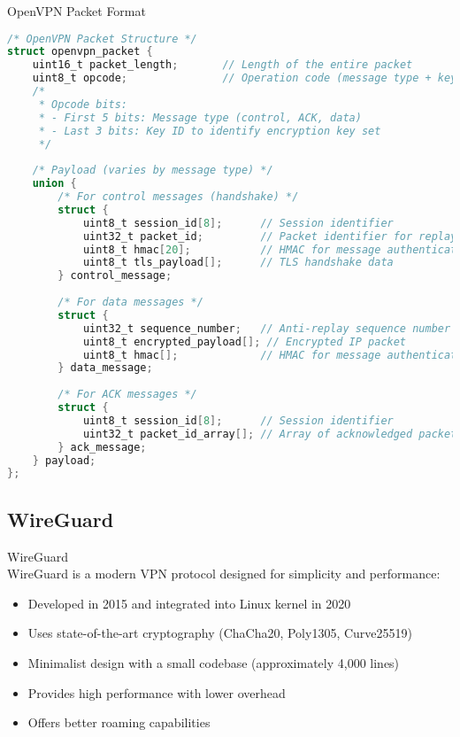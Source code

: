 \begin{code}{OpenVPN Packet Format}\\
\begin{lstlisting}[language=C, style=basesmol]
/* OpenVPN Packet Structure */
struct openvpn_packet {
    uint16_t packet_length;       // Length of the entire packet
    uint8_t opcode;               // Operation code (message type + key ID)
    /* 
     * Opcode bits:
     * - First 5 bits: Message type (control, ACK, data)
     * - Last 3 bits: Key ID to identify encryption key set
     */
    
    /* Payload (varies by message type) */
    union {
        /* For control messages (handshake) */
        struct {
            uint8_t session_id[8];      // Session identifier
            uint32_t packet_id;         // Packet identifier for replay protection
            uint8_t hmac[20];           // HMAC for message authentication
            uint8_t tls_payload[];      // TLS handshake data
        } control_message;
        
        /* For data messages */
        struct {
            uint32_t sequence_number;   // Anti-replay sequence number
            uint8_t encrypted_payload[]; // Encrypted IP packet
            uint8_t hmac[];             // HMAC for message authentication
        } data_message;
        
        /* For ACK messages */
        struct {
            uint8_t session_id[8];      // Session identifier
            uint32_t packet_id_array[]; // Array of acknowledged packet IDs
        } ack_message;
    } payload;
};
\end{lstlisting}
\end{code}

\subsection{WireGuard}

\begin{definition}{WireGuard}\\
WireGuard is a modern VPN protocol designed for simplicity and performance:
\begin{itemize}
    \item Developed in 2015 and integrated into Linux kernel in 2020
    \item Uses state-of-the-art cryptography (ChaCha20, Poly1305, Curve25519)
    \item Minimalist design with a small codebase (approximately 4,000 lines)
    \item Provides high performance with lower overhead
    \item Offers better roaming capabilities
\end{itemize}
\end{definition}

